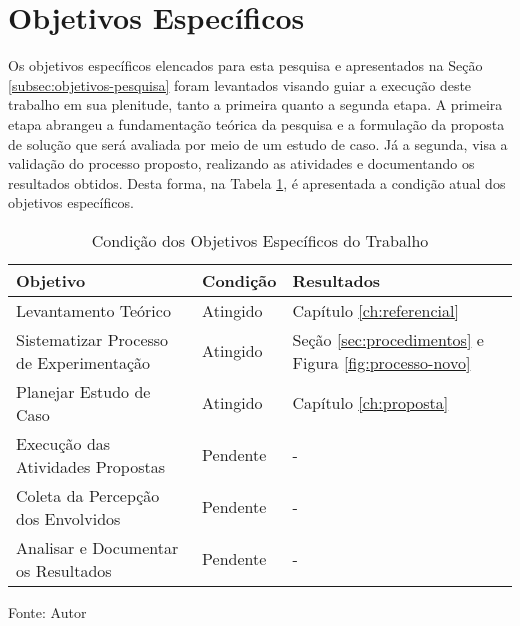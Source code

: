 \section{Objetivos Específicos}

Os objetivos específicos elencados para esta pesquisa e apresentados na Seção \ref{subsec:objetivos-pesquisa} foram levantados visando guiar a execução deste trabalho em sua plenitude, tanto a primeira quanto a segunda etapa. A primeira etapa abrangeu a fundamentação teórica da pesquisa e a formulação da proposta de solução que será avaliada por meio de um estudo de caso. Já a segunda, visa a validação do processo proposto, realizando as atividades e documentando os resultados obtidos. Desta forma, na Tabela \ref{tab:objetivos-especificos}, é apresentada a condição atual dos objetivos específicos.


\begin{table}[]
\centering
    \caption{Condição dos Objetivos Específicos do Trabalho}
    \begin{tabular}{|p{8cm}|p{2cm}|p{4.5cm}|}
        \hline
        \textbf{Objetivo} & \textbf{Condição} & \textbf{Resultados} \\ \hline
        Levantamento Teórico & Atingido & Capítulo \ref{ch:referencial} \\ \hline
        Sistematizar Processo de Experimentação & Atingido & Seção \ref{sec:procedimentos} e Figura \ref{fig:processo-novo} \\ \hline
        Planejar Estudo de Caso & Atingido & Capítulo \ref{ch:proposta} \\ \hline
        Execução das Atividades Propostas & Pendente & - \\ \hline
        Coleta da Percepção dos Envolvidos & Pendente & - \\ \hline
        Analisar e Documentar os Resultados & Pendente & - \\ \hline
    \end{tabular}

    \label{tab:objetivos-especificos}
    
    \begin{center}
        \text Fonte: Autor
    \end{center}
\end{table}
